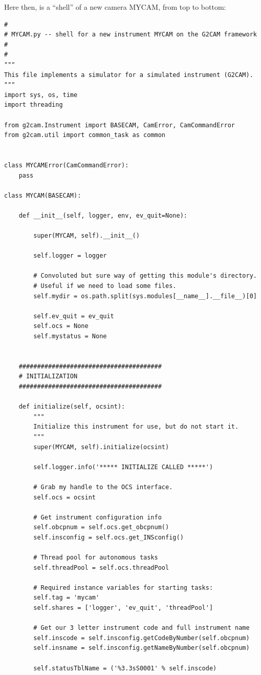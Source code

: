 \documentclass[11pt]{report}
\begin{document}
Here then, is a ``shell'' of a new camera MYCAM, from top to bottom:
\begin{verbatim}
#
# MYCAM.py -- shell for a new instrument MYCAM on the G2CAM framework
#
#
"""
This file implements a simulator for a simulated instrument (G2CAM).
"""
import sys, os, time
import threading

from g2cam.Instrument import BASECAM, CamError, CamCommandError
from g2cam.util import common_task as common


class MYCAMError(CamCommandError):
    pass

class MYCAM(BASECAM):

    def __init__(self, logger, env, ev_quit=None):

        super(MYCAM, self).__init__()
        
        self.logger = logger

        # Convoluted but sure way of getting this module's directory.
        # Useful if we need to load some files.
        self.mydir = os.path.split(sys.modules[__name__].__file__)[0]

        self.ev_quit = ev_quit
        self.ocs = None
        self.mystatus = None


    #######################################
    # INITIALIZATION
    #######################################

    def initialize(self, ocsint):
        """
        Initialize this instrument for use, but do not start it.  
        """
        super(MYCAM, self).initialize(ocsint)

        self.logger.info('***** INITIALIZE CALLED *****')

        # Grab my handle to the OCS interface.
        self.ocs = ocsint

        # Get instrument configuration info
        self.obcpnum = self.ocs.get_obcpnum()
        self.insconfig = self.ocs.get_INSconfig()

        # Thread pool for autonomous tasks
        self.threadPool = self.ocs.threadPool

        # Required instance variables for starting tasks:
        self.tag = 'mycam'
        self.shares = ['logger', 'ev_quit', 'threadPool']
        
        # Get our 3 letter instrument code and full instrument name
        self.inscode = self.insconfig.getCodeByNumber(self.obcpnum)
        self.insname = self.insconfig.getNameByNumber(self.obcpnum)
        
        self.statusTblName = ('%3.3sS0001' % self.inscode)


\end{verbatim}
\end{document}
